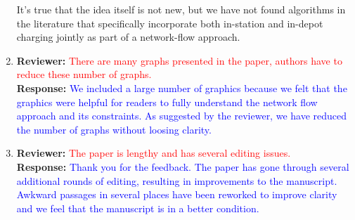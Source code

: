 \documentclass{article}
\newcommand\formatfeedback[2]
{%
	\textbf{Reviewer:} \textcolor{red}{#1} 
	\\[0.1in] \textbf{Response:} \textcolor{blue}{#2}
}
\begin{document}
\begin{enumerate}
			     {It's true that the idea itself is not new, but we have not found algorithms in the literature that specifically incorporate both in-station and in-depot charging jointly as part of a network-flow approach.} 
	\item \formatfeedback{There are many graphs presented in the paper, authors have to reduce these number of graphs.}%
			     {We included a large number of graphics because we felt that the graphics were helpful for readers to fully understand the network flow approach and its constraints. As suggested by the reviewer, we have reduced the number of graphs without loosing clarity.} 
	\item \formatfeedback{The paper is lengthy and has several editing issues.}%
			     {Thank you for the feedback. The paper has gone through several additional rounds of editing, resulting in improvements to the manuscript.  Awkward passages in several places have been reworked to improve clarity and we feel that the manuscript is in a better condition.} 
\end{enumerate}
\end{document}
